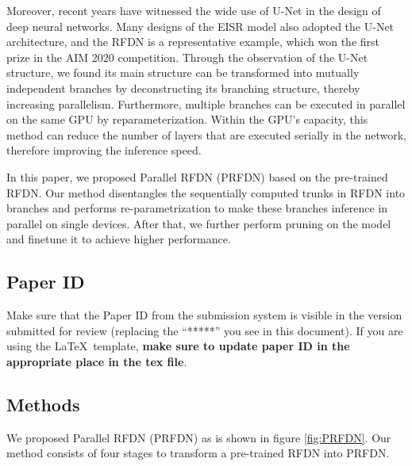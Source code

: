 \documentclass[10pt,twocolumn,letterpaper]{article}
\begin{document}
Moreover, recent years have witnessed the wide use of U-Net\cite{ronnebergerUNetConvolutionalNetworks2015} in the design of deep neural networks. 
Many designs of the EISR model also adopted the U-Net architecture, and the RFDN\cite{liu2020residual} is a representative example, which won the first prize in the AIM 2020 competition. 
Through the observation of the U-Net structure, we found its main structure can be transformed into mutually independent branches by deconstructing its branching structure, thereby increasing parallelism. 
Furthermore, multiple branches can be executed in parallel on the same GPU by reparameterization. 
Within the GPU's capacity, this method can reduce the number of layers that are executed serially in the network, therefore improving the inference speed.

In this paper, we proposed Parallel RFDN (PRFDN) based on the pre-trained RFDN. Our method disentangles the sequentially computed trunks in RFDN into branches and performs re-parametrization to make these branches inference in parallel on single devices. After that, we further perform pruning on the model and finetune it to achieve higher performance.

\subsection{Paper ID}
Make sure that the Paper ID from the submission system is visible in the version submitted for review (replacing the ``*****'' you see in this document).
If you are using the \LaTeX\ template, \textbf{make sure to update paper ID in the appropriate place in the tex file}.


\subsection{Methods}

We proposed Parallel RFDN (PRFDN) as is shown in figure \ref{fig:PRFDN}.
Our method consists of four stages to transform a pre-trained RFDN\cite{liu2020residual} into PRFDN.
\end{document}
